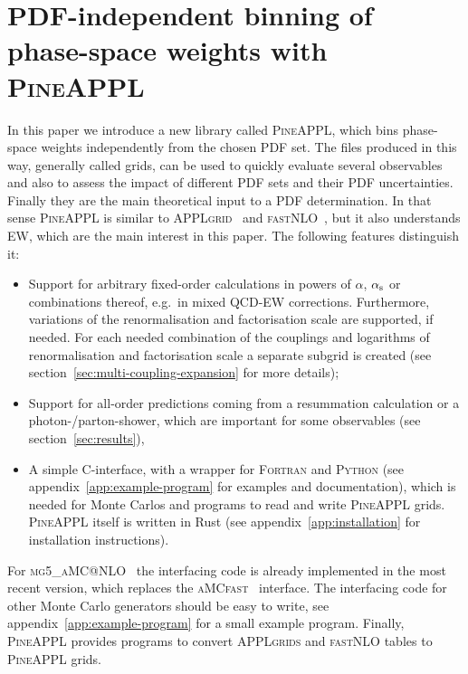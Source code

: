 \section{PDF-independent binning of phase-space weights with \texorpdfstring{\textsc{PineAPPL}}{PineAPPL}}
\label{sec:pineappl}

In this paper we introduce a new library called \textsc{PineAPPL}, which bins phase-space weights independently from the chosen PDF set.
The files produced in this way, generally called grids, can be used to quickly evaluate several observables and also to assess the impact of different PDF sets and their PDF uncertainties.
Finally they are the main theoretical input to a PDF determination.
In that sense \textsc{PineAPPL} is similar to \textsc{APPLgrid}~\cite{Carli:2010rw} and \textsc{fastNLO}~\cite{Kluge:2006xs,Wobisch:2011ij,Britzger:2012bs}, but it also understands EW, which are the main interest in this paper.
The following features distinguish it:
\begin{itemize}
\item Support for arbitrary fixed-order calculations in powers of $\alpha$, $\alpha_\mathrm{s}$ or combinations thereof, e.g.\ in mixed QCD-EW corrections.
Furthermore, variations of the renormalisation and factorisation scale are supported, if needed.
For each needed combination of the couplings and logarithms of renormalisation and factorisation scale a separate subgrid is created (see section~\ref{sec:multi-coupling-expansion} for more details);
\item Support for all-order predictions coming from a resummation calculation or a photon-/parton-shower, which are important for some observables (see section~\ref{sec:results}),
\item A simple \textsc{C}-interface, with a wrapper for \textsc{Fortran} and \textsc{Python} (see appendix~\ref{app:example-program} for examples and documentation), which is needed for Monte Carlos and programs to read and write \textsc{PineAPPL} grids.
\textsc{PineAPPL} itself is written in Rust (see appendix~\ref{app:installation} for installation instructions).
\end{itemize}
For \textsc{mg5\_aMC@NLO}~\cite{Alwall:2014hca,Frederix:2018nkq} the interfacing code is already implemented in the most recent version, which replaces the \textsc{aMCfast}~\cite{Bertone:2014zva} interface.
The interfacing code for other Monte Carlo generators should be easy to write, see appendix~\ref{app:example-program} for a small example program.
Finally, \textsc{PineAPPL} provides programs to convert \textsc{APPLgrids} and \textsc{fastNLO} tables to \textsc{PineAPPL} grids.

